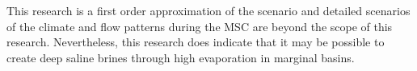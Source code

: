 \documentclass[twocolumn]{article}
\begin{document}
This research is a first order approximation of the scenario and detailed scenarios of the climate and flow patterns during the MSC are beyond the scope of this research. Nevertheless, this research does indicate that it may be possible to create deep saline brines through high evaporation in marginal basins.





\end{document}
